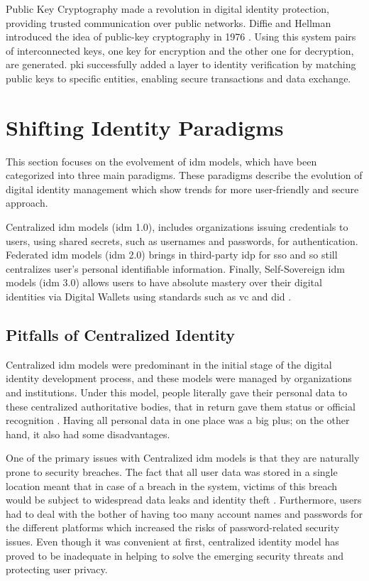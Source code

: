 Public Key Cryptography made a revolution in digital identity protection, providing trusted communication over public networks. Diffie and Hellman introduced the idea of 
public-key cryptography in 1976 \cite{businessreporter}. Using this system pairs of interconnected keys, one key for encryption and the other one for decryption, are 
generated. \gls{pki} successfully added a layer to identity verification by matching public keys to specific entities, enabling secure transactions and data exchange.

\section{Shifting Identity Paradigms}

This section focuses on the evolvement of \gls{idm} models, which have been categorized into three main paradigms. These paradigms describe the evolution of digital identity 
management which show trends for more user-friendly and secure approach.

Centralized \gls{idm} models (\gls{idm} 1.0), includes organizations issuing credentials to users, using shared secrets, such as usernames and passwords, for authentication. 
Federated \gls{idm} models (\gls{idm} 2.0) brings in third-party \gls{idp} for \gls{sso} and so still centralizes user's personal identifiable information. Finally, 
Self-Sovereign \gls{idm} models (\gls{idm} 3.0) allows users to have absolute mastery over their digital identities via Digital Wallets using standards such as 
\gls{vc} and \gls{did} \cite{9272212}.

\subsection{Pitfalls of Centralized Identity}

Centralized \gls{idm} models were predominant in the initial stage of the digital identity development process, and these models were managed by 
organizations and institutions. Under this model, people literally gave their personal data to these centralized authoritative bodies, that in return gave them status or 
official recognition \cite{9695553}. Having all personal data in one place was a big plus; on the other hand, it also had some disadvantages.

One of the primary issues with Centralized \gls{idm} models is that they are naturally prone to security breaches. The fact that all user data was stored in a single 
location meant that in case of a breach in the system, victims of this breach would be subject to widespread data leaks and identity theft \cite{businessreporter}. 
Furthermore, users had to deal with the bother of having too many account names and passwords for the different platforms which increased the risks of password-related 
security issues. Even though it was convenient at first, centralized identity model has proved to be inadequate in helping to solve the emerging security threats and 
protecting user privacy.

